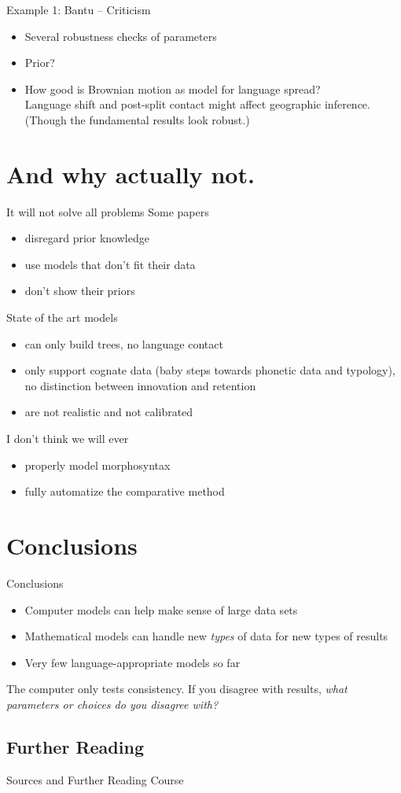 \documentclass[9pt]{beamer}
\begin{document}
\begin{frame}{Example 1: Bantu – Criticism}
  \begin{itemize}
  \item Several robustness checks of parameters
  \item Prior?
  \item How good is Brownian motion as model for language spread?\\
    Language shift and post-split contact might affect geographic
    inference. (Though the fundamental results look robust.)
  \end{itemize}
\end{frame}
\section{And why actually not.}
\begin{frame}{It will not solve all problems}
  Some papers
  \begin{itemize}
  \item disregard prior knowledge
  \item use models that don't fit their data
  \item don't show their priors
  \end{itemize}
  \pause
  State of the art models
  \begin{itemize}
  \item can only build trees, no language contact
    \pause
  \item only support cognate data (baby steps towards phonetic data and typology),
    \pause no distinction between innovation and retention
    \pause 
  \item are not realistic and not calibrated
  \end{itemize}
  \pause
  I don't think we will ever
  \begin{itemize}
  \item properly model morphosyntax
  \item fully automatize the comparative method
  \end{itemize}
\end{frame}
\section{Conclusions}
\begin{frame}{Conclusions}
  \begin{itemize}
  \item Computer models can help make sense of large data sets
  \item Mathematical models can handle new \emph{types} of data for new types of results
  \item Very few language-appropriate models so far
  \end{itemize}
  The computer only tests consistency.
  If you disagree with results, \emph{what parameters or choices do you disagree with?}
\end{frame}
\subsection{Further Reading}
\begin{frame}[t,allowframebreaks]{Sources and Further Reading}
  Course
  \printbibliography
\end{frame}
\end{document}
